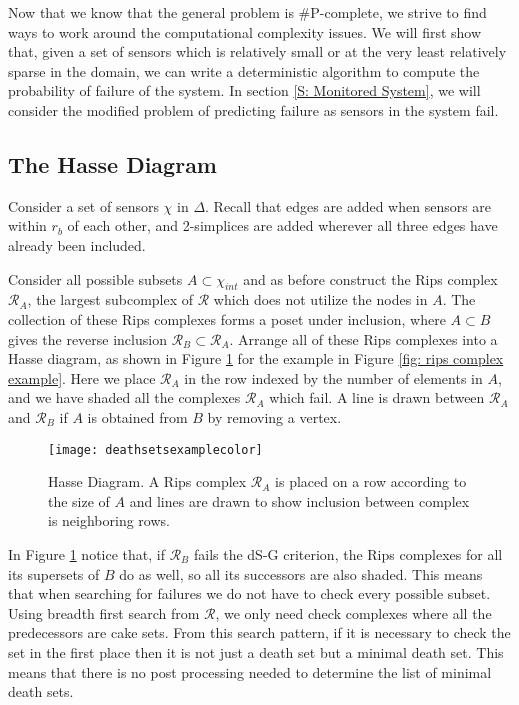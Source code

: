\documentclass[10pt,twocolumn]{article} \usepackage{amsmath,epsf,amssymb,cite,pifont,amsthm, mathrsfs,epsfig,  bbm, amsthm,  setspace}
\newcommand{\RR}{\mathcal R}
\renewcommand{\1}{\mathbbm{1}}
\begin{document}
Now that we know that the general problem is \#P-complete,
we strive to find ways to work around the computational complexity issues.
We will first show that, given a set of sensors which is relatively small
or at the very least relatively sparse in the domain, we can write a deterministic
algorithm to compute the probability of failure of the system.
In section \ref{S: Monitored System}, we will  consider the modified
problem of predicting failure as sensors in the system fail.


\subsection{The Hasse Diagram}\label{S: Hasse}

Consider a set of sensors $\chi$ in $\Delta $.
Recall that edges are added when  sensors are within $r_b$ of each other,
and 2-simplices are added wherever all three edges have already been included.

Consider all possible subsets $A \subset \chi_{int}$ and
as before construct the Rips complex $\RR_A$,
the largest subcomplex of $\RR$ which does not utilize the nodes in $A$.
The collection of  these Rips complexes forms a poset under inclusion,
where $A \subset B$ gives the reverse inclusion $\RR_B \subset \RR_A$.
Arrange all of these Rips complexes into a Hasse diagram,
as shown in Figure \ref{fig: Inclusion Diagram} for the example in
Figure \ref{fig: rips complex example}.
Here we place $\RR_A$ in the row indexed by the number of elements in $A$,
and we have shaded all the complexes $\RR_A$ which fail.
A line is drawn between $\RR_A$ and $\RR_B$ if $A$ is obtained from $B$
by removing a vertex.

\begin{figure}[h]
\begin{center}
\texttt{[image: deathsetsexamplecolor]}
\end{center}
\caption{Hasse Diagram.  A Rips complex $\RR_A$ is placed on a row according to the size of $A$ and lines are drawn to show inclusion between complex is neighboring rows.}\label{fig: Inclusion Diagram}
\end{figure}

In Figure \ref{fig: Inclusion Diagram} notice that, if $\RR_B$ fails the dS-G criterion, the Rips
complexes for all its supersets of $B$ do as well, so all its successors are also shaded.
This means that when searching for failures we do not have to check every possible subset.
Using breadth first search from $\RR$, we only need check complexes where all the predecessors are cake sets.
From this search pattern, if it is necessary to check the set in the first place
then it is not just a death set but a minimal death set.
This means that there is no post processing needed to determine the list of minimal death sets.
\end{document}
